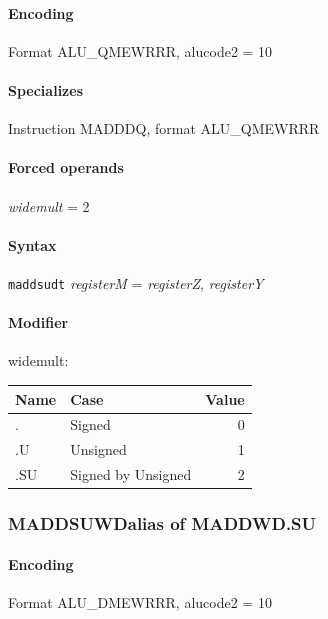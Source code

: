 {\paragraph{Encoding} Format \textsf{ALU\_QMEWRRR, alucode2 = 10}\\



\paragraph{Specializes} Instruction MADDDQ, format ALU\_QMEWRRR

\paragraph{Forced operands} \emph{widemult} = 2

\paragraph{Syntax} \texttt{maddsudt} \emph{registerM} = \emph{registerZ}, \emph{registerY}

\paragraph{Modifier} \textsf{widemult}:\\

\noindent \begin{tabular}{|l|l|r|} \hline
\bf{Name} & \bf{Case} & \bf{Value} \\ \hline
. & Signed & 0 \\
.U & Unsigned & 1 \\
.SU & Signed by Unsigned & 2 \\
\hline \end{tabular}
\newpage
\subsubsection[{\small MADDSUWD: alias of MADDWD.SU}]{MADDSUWD\hfill alias of MADDWD.SU}
\label{instr:MADDSUWD}

\paragraph{Encoding} Format \textsf{ALU\_DMEWRRR, alucode2 = 10}\\

}
